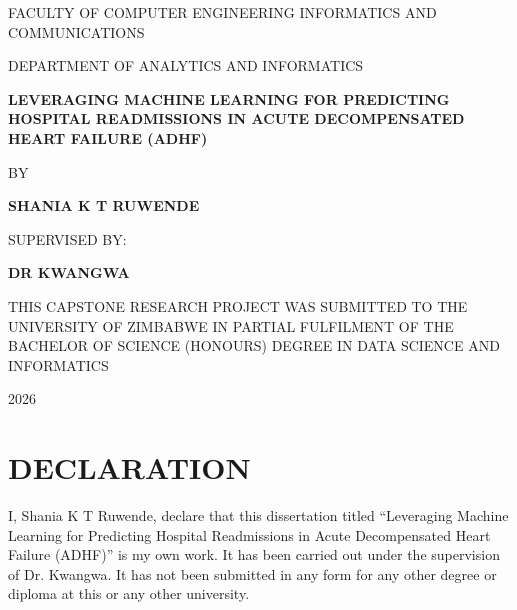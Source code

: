 \documentclass[12pt,a4paper]{report}
\begin{document}
\begin{titlepage}
\centering

{\large FACULTY OF COMPUTER ENGINEERING INFORMATICS AND COMMUNICATIONS\par}
\vspace{0.5em}
{\large DEPARTMENT OF ANALYTICS AND INFORMATICS\par}
\vspace{2.5em}

{\Large\bfseries LEVERAGING MACHINE LEARNING FOR PREDICTING HOSPITAL READMISSIONS IN ACUTE DECOMPENSATED HEART FAILURE (ADHF)\par}
\vspace{2em}

{\large BY\par}
\vspace{1em}
{\Large\bfseries SHANIA K T RUWENDE\par}
\vspace{2em}

{\large SUPERVISED BY:\par}
\vspace{0.5em}
{\Large\bfseries DR KWANGWA\par}
\vspace{2.5em}

{\large THIS CAPSTONE RESEARCH PROJECT WAS SUBMITTED TO THE UNIVERSITY OF ZIMBABWE IN PARTIAL FULFILMENT OF THE BACHELOR OF SCIENCE (HONOURS) DEGREE IN DATA SCIENCE AND INFORMATICS\par}
\vfill

{\large 2026\par}

\end{titlepage}


\chapter*{DECLARATION}
I, Shania K T Ruwende, declare that this dissertation titled ``Leveraging Machine Learning for Predicting Hospital Readmissions in Acute Decompensated Heart Failure (ADHF)'' is my own work. It has been carried out under the supervision of Dr. Kwangwa. It has not been submitted in any form for any other degree or diploma at this or any other university.
\end{document}
